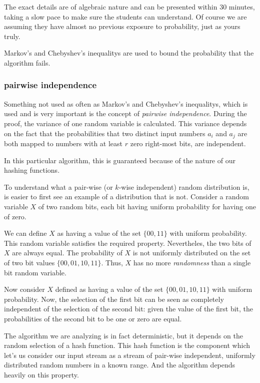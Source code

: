 \documentclass[12pt]{article}
\begin{document}
The exact details are of algebraic nature and can be presented within 30 minutes, taking a slow pace to make sure the students can understand. Of course we are assuming they have almost no previous exposure to probability, just as yours truly.

Markov's and Chebyshev's inequalitys are used to bound the probability that the algorithm fails.

\subsubsection{pairwise independence}

Something not used as often as Markov's and Chebyshev's inequalitys, which is used and is very important 
is the concept of \emph{pairwise independence}. During the proof, the variance of one random variable is calculated. 
This variance depends on the fact that the probabilities that two distinct input numbers $a_i$ and $a_j$ are both mapped to numbers with at least $r$ zero right-most bits, are independent.

In this particular algorithm, this is guaranteed because of the nature of our hashing functions.

To understand what a pair-wise (or $k$-wise independent)  random distribution is, is easier to first see an example of a distribution that is not. 
Consider a  random variable $X$ of two random bits, each bit having uniform probability for having one of zero.

We can define $X$ as having a value of the set $\{00,11\}$ with uniform probability. This random variable satisfies the required property. Nevertheles, the two bits of $X$ are always equal. The probability of $X$ is not uniformly distributed on the set of two bit values $\{00,01,10,11\}$.
Thus, $X$ has no more \emph{randomness} than a single bit random variable.

Now consider $X$ defined as having a value of the set $\{00,01,10,11\}$ with uniform probability. Now, the selection of the first bit can be seen as completely independent of the selection of the second bit: given the value of the first bit, the probabilities  of the second bit to be one or zero are equal.

The algorithm we are analyzing is in fact deterministic, but it depends on the random selection of a hash function. This hash function is the component which let's us consider our input stream as a stream of pair-wise independent, uniformly distributed random numbers in a known range. And the algorithm depends heavily on this property.
\end{document}
